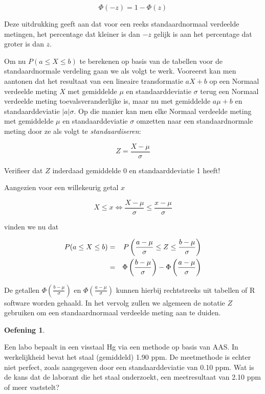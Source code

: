 \documentclass[
  12pt,dutch,coursenotes]{book}
\theoremstyle{definition}
\theoremstyle{definition}
\theoremstyle{definition}
\newtheorem{exercise}{Oefening}[chapter]
\theoremstyle{definition}
\theoremstyle{remark}
\begin{document}
\begin{equation*}
\Phi(-z)= 1- \Phi(z)
\end{equation*}

Deze uitdrukking geeft aan dat voor een reeks standaardnormaal verdeelde
metingen, het percentage dat kleiner is dan \(-z\) gelijk is aan
het percentage dat groter is dan \(z\).

Om nu \(P(a\leq X\leq b)\) te berekenen op basis van de tabellen voor de
standaardnormale verdeling gaan we als volgt te werk. Vooreerst kan men
aantonen dat het resultaat van een lineaire transformatie \(aX+b\) op een
Normaal verdeelde meting \(X\) met gemiddelde \(\mu\) en standaarddeviatie \(\sigma\) terug een Normaal verdeelde meting toevalsveranderlijke is, maar nu
met gemiddelde \(a\mu+b\) en standaarddeviatie \(|a|\sigma\). Op die manier kan
men elke Normaal verdeelde meting met gemiddelde \(\mu\) en standaarddeviatie \(\sigma\) omzetten naar een standaardnormale meting door ze als volgt te
\emph{standaardiseren}:

\begin{equation*}
Z = \frac{X- \mu}{\sigma}
\end{equation*}

Verifieer dat \(Z\) inderdaad gemiddelde 0 en standaarddeviatie 1 heeft!

Aangezien voor een willekeurig getal \(x\)

\begin{equation*}
X\leq x \Leftrightarrow \frac{X-\mu}{\sigma} \leq \frac{x-\mu}{\sigma}
\end{equation*}

vinden we nu dat

\begin{eqnarray*}
P(a \leq X \leq b) & = & P\left(\frac{a-\mu}{\sigma} \leq Z \leq \frac{b-\mu%
}{\sigma} \right) \\
& = & \Phi \left (\frac{b-\mu}{\sigma} \right ) - \Phi \left (\frac{a-\mu}{%
\sigma} \right )
\end{eqnarray*}

De getallen \(\Phi \left (\frac{b-\mu}{\sigma} \right )\) en \(\Phi \left (\frac{a-\mu}{\sigma} \right )\) kunnen hierbij rechtstreeks uit tabellen of R software worden gehaald. In het vervolg zullen we
algemeen de notatie \(Z\) gebruiken om een standaardnormaal verdeelde meting
aan te duiden.

\begin{exercise}
\protect\hypertarget{exr:unnamed-chunk-42}{}{\label{exr:unnamed-chunk-42} }
\end{exercise}
Een labo bepaalt in een visstaal Hg via een methode op basis van AAS. In
werkelijkheid bevat het staal (gemiddeld) 1.90 ppm. De meetmethode is echter
niet perfect, zoals aangegeven door een standaarddeviatie van 0.10 ppm. Wat
is de kans dat de laborant die het staal onderzoekt, een meetresultaat van
2.10 ppm of meer vaststelt?
\end{document}
